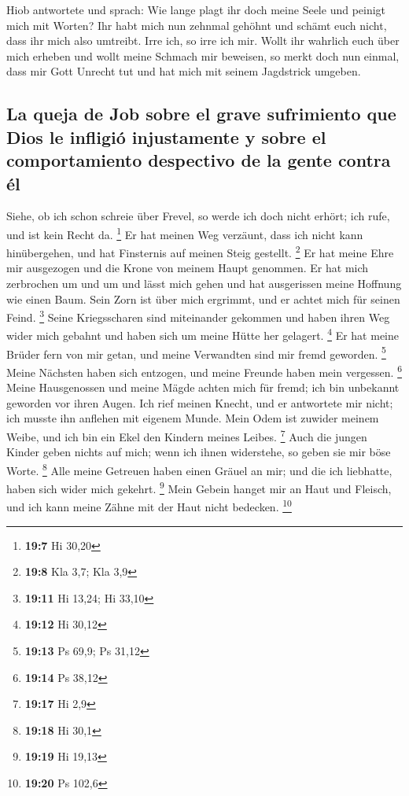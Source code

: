  Hiob antwortete und sprach:  Wie lange
plagt ihr doch meine Seele und peinigt mich mit Worten? 
Ihr habt mich nun zehnmal gehöhnt und schämt euch nicht, dass ihr mich
also umtreibt.  Irre ich, so irre ich mir. 
Wollt ihr wahrlich euch über mich erheben und wollt meine Schmach mir
beweisen,  so merkt doch nun einmal, dass mir Gott Unrecht
tut und hat mich mit seinem Jagdstrick umgeben.

\hypertarget{la-queja-de-job-sobre-el-grave-sufrimiento-que-dios-le-infligiuxf3-injustamente-y-sobre-el-comportamiento-despectivo-de-la-gente-contra-uxe9l}{%
\subsection{La queja de Job sobre el grave sufrimiento que Dios le
infligió injustamente y sobre el comportamiento despectivo de la gente
contra
él}\label{la-queja-de-job-sobre-el-grave-sufrimiento-que-dios-le-infligiuxf3-injustamente-y-sobre-el-comportamiento-despectivo-de-la-gente-contra-uxe9l}}

 Siehe, ob ich schon schreie über Frevel, so werde ich
doch nicht erhört; ich rufe, und ist kein Recht da. \footnote{\textbf{19:7}
  Hi 30,20}  Er hat meinen Weg verzäunt, dass ich nicht
kann hinübergehen, und hat Finsternis auf meinen Steig gestellt.
\footnote{\textbf{19:8} Kla 3,7; Kla 3,9}  Er hat meine
Ehre mir ausgezogen und die Krone von meinem Haupt genommen.
 Er hat mich zerbrochen um und um und lässt mich gehen
und hat ausgerissen meine Hoffnung wie einen Baum.  Sein
Zorn ist über mich ergrimmt, und er achtet mich für seinen Feind.
\footnote{\textbf{19:11} Hi 13,24; Hi 33,10}  Seine
Kriegsscharen sind miteinander gekommen und haben ihren Weg wider mich
gebahnt und haben sich um meine Hütte her gelagert. \footnote{\textbf{19:12}
  Hi 30,12}  Er hat meine Brüder fern von mir getan, und
meine Verwandten sind mir fremd geworden. \footnote{\textbf{19:13} Ps
  69,9; Ps 31,12}  Meine Nächsten haben sich entzogen,
und meine Freunde haben mein vergessen. \footnote{\textbf{19:14} Ps
  38,12}  Meine Hausgenossen und meine Mägde achten mich
für fremd; ich bin unbekannt geworden vor ihren Augen. 
Ich rief meinen Knecht, und er antwortete mir nicht; ich musste ihn
anflehen mit eigenem Munde.  Mein Odem ist zuwider meinem
Weibe, und ich bin ein Ekel den Kindern meines Leibes. \footnote{\textbf{19:17}
  Hi 2,9}  Auch die jungen Kinder geben nichts auf mich;
wenn ich ihnen widerstehe, so geben sie mir böse Worte. \footnote{\textbf{19:18}
  Hi 30,1}  Alle meine Getreuen haben einen Gräuel an
mir; und die ich liebhatte, haben sich wider mich gekehrt. \footnote{\textbf{19:19}
  Hi 19,13}  Mein Gebein hanget mir an Haut und Fleisch,
und ich kann meine Zähne mit der Haut nicht bedecken. \footnote{\textbf{19:20}
  Ps 102,6}

